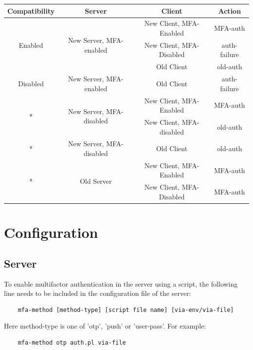 \documentclass[11pt,oneside]{book}
\begin{document}
{
    \centering
    \begin{tabular}{|c|c|c|c|}
        \hline
        \textbf{Compatibility} & \textbf{Server} & \textbf{Client} & \textbf{Action} \\

        \hline
        \multirow{3}{*}{Enabled} & \multirow{3}{*}{New Server, MFA-enabled} & New Client, MFA-Enabled & MFA-auth\\
                                 & & New Client, MFA-Disabled & auth-failure\\
                                 & & Old Client & old-auth\\
        \hline
        Disabled & New Server, MFA-enabled & Old Client & auth-failure\\

        \hline
        \multirow{2}{*}{*} & \multirow{2}{*}{New Server, MFA-disabled} & New Client, MFA-Enabled & MFA-auth\\
                           & & New Client, MFA-disabled & old-auth\\
        \hline
        * & New Server, MFA-disabled & Old Client & old-auth\\
        \hline
        \multirow{2}{*}{*} & \multirow{2}{*}{Old Server} & New Client, MFA-Enabled & MFA-auth\\
                           & & New Client, MFA-Disabled & MFA-auth\\
        \hline
    \end{tabular}
}

\section{Configuration}
\subsection{Server}
To enable multifactor authentication in the server using a script, the following line needs to be
included in the configuration file of the server:

\begin{verbatim}
    mfa-method [method-type] [script file name] [via-env/via-file]
\end{verbatim}

\noindent Here method-type is one of 'otp', 'push' or 'user-pass'. For example:
\begin{verbatim}
    mfa-method otp auth.pl via-file
\end{verbatim}
\end{document}
